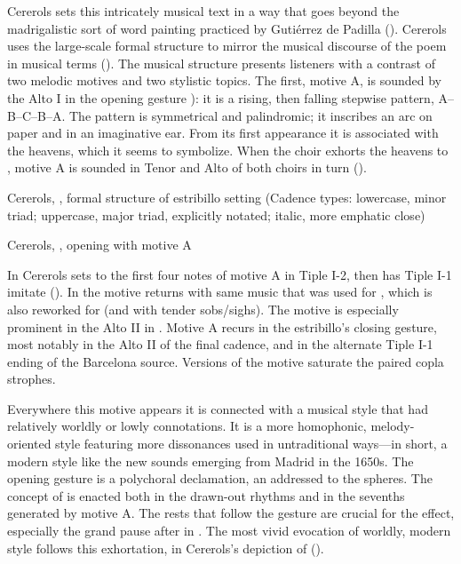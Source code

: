 Cererols sets this intricately musical text in a way that goes beyond the
madrigalistic sort of word painting practiced by Gutiérrez de Padilla
().
Cererols uses the large-scale formal structure to mirror the musical discourse
of the poem in musical terms ().
The musical structure presents listeners with a contrast of two melodic motives
and two stylistic topics.
The first, motive A, is sounded by the Alto I in the opening gesture
): it is a rising, then falling
stepwise pattern, A--B--C--B--A.
The pattern is symmetrical and palindromic; it inscribes an arc on paper and
in an imaginative ear.
From its first appearance it is associated with the heavens, which it seems to
symbolize.
When the choir exhorts the heavens to , motive A is
sounded in Tenor and Alto of both choirs in turn ().


{Cererols, , formal structure of estribillo setting
(Cadence types: lowercase, minor triad; uppercase, major triad, explicitly
notated; italic, more emphatic close)}

{Cererols, , opening with motive A}

In  Cererols sets  to the
first four notes of motive A in Tiple I-2, then has Tiple I-1 imitate
().
In  the motive returns with same music that was used for
, which is also reworked for  (and with tender sobs/sighs).
The motive is especially prominent in the Alto II in .
Motive A recurs in the estribillo's closing gesture, most notably in the Alto II
of the final cadence, and in the alternate Tiple I-1 ending of the Barcelona
source.
Versions of the motive saturate the paired copla strophes.

Everywhere this motive appears it is connected with a musical style that had
relatively worldly or lowly connotations.
It is a more homophonic, melody-oriented style featuring more dissonances used
in untraditional ways---in short, a modern style like the new sounds
emerging from Madrid in the 1650s.
The opening gesture is a polychoral declamation, an  addressed to
the spheres.
The concept of  is enacted both in the drawn-out rhythms and
in the sevenths generated by motive A.
The rests that follow the gesture are crucial for the effect, especially the
grand pause after  in .
The most vivid evocation of worldly, modern style follows this exhortation, in
Cererols's depiction of  ().

